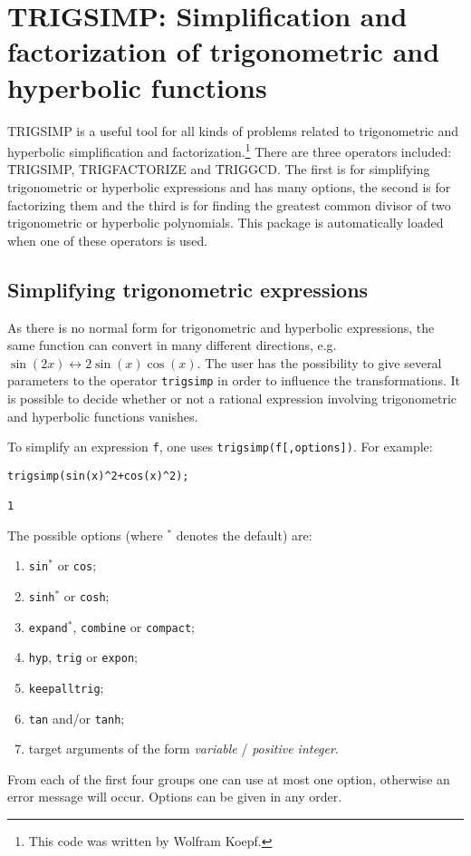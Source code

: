 \section[TRIGSIMP]{TRIGSIMP: Simplification and factorization of trigonometric
and hyperbolic functions}
\label{TRIGSIMP}

TRIGSIMP is a useful tool for all kinds of
problems related to trigonometric and hyperbolic simplification and
factorization.\footnote{This code was written by Wolfram Koepf.}  There are three operators included:
\f{TRIGSIMP}, \f{TRIGFACTORIZE} and \f{TRIGGCD}.  The first is for simplifying
trigonometric or hyperbolic expressions and has many options, the
second is for factorizing them and the third is for finding the
greatest common divisor of two trigonometric or hyperbolic
polynomials.  This package is automatically loaded when one of these
operators is used.


\subsection{Simplifying trigonometric expressions}
\hypertarget{operator:TRIGSIMP}{}
As there is no normal form for trigonometric and hyperbolic
expressions, the same function can convert in many different
directions, e.g.\ $\sin(2x) \leftrightarrow 2\sin(x)\cos(x)$.  The
user has the possibility to give several parameters to the operator
\texttt{trigsimp} in order to influence the transformations.  It is
possible to decide whether or not a rational expression involving
trigonometric and hyperbolic functions vanishes.

To simplify an expression \texttt{f}, one uses
\texttt{trigsimp(f[,options])}.  For example:
\begin{verbatim}
trigsimp(sin(x)^2+cos(x)^2);

1
\end{verbatim}
The possible options (where $^*$ denotes the default) are:
\begin{enumerate}
\item \texttt{sin}$^*$ or \texttt{cos};
\item \texttt{sinh}$^*$ or \texttt{cosh};
\item \texttt{expand}$^*$, \texttt{combine} or \texttt{compact};
\item \texttt{hyp}, \texttt{trig} or \texttt{expon};
\item \texttt{keepalltrig};
\item \texttt{tan} and/or \texttt{tanh};
\item target arguments of the form \textit{variable} /
\textit{positive integer}.
\end{enumerate}
From each of the first four groups one can use at most one option,
otherwise an error message will occur.  Options can be given in any
order.

